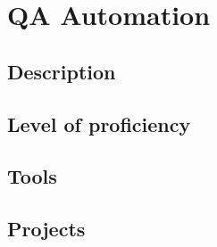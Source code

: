 \section{QA Automation}

\subsection{Description}
\subsection{Level of proficiency}
\subsection{Tools}
\subsection{Projects}

\newpage
